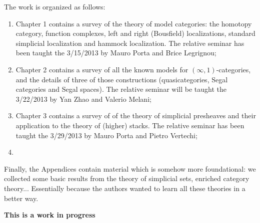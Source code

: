 \documentclass[a4paper]{memoir}
\theoremstyle{definition}
\theoremstyle{definition}
\theoremstyle{remark}
\begin{document}
The work is organized as follows:

\begin{enumerate}
\item Chapter 1 contains a survey of the theory of model categories: the homotopy category, function complexes, left and right (Bousfield) localizations, standard simplicial localization and hammock localization. The relative seminar has been taught the 3/15/2013 by Mauro Porta and Brice Legrignou;
\item Chapter 2 contains a survey of all the known models for $(\infty,1)$-categories, and the details of three of those constructions (quasicategories, Segal categories and Segal spaces). The relative seminar will be taught the 3/22/2013 by Yan Zhao and Valerio Melani;
\item Chapter 3 contains a survey of of the theory of simplicial presheaves and their application to the theory of (higher) stacks. The relative seminar has been taught the 3/29/2013 by Mauro Porta and Pietro Vertechi;
\item
\end{enumerate}

Finally, the Appendices contain material which is somehow more foundational: we collected some basic results from the theory of simplicial sets, enriched category theory... Essentially because the authors wanted to learn all these theories in a better way.

{\bfseries This is a work in progress}

\mainmatter

%
%
%
%
%
%
%

%
%

%
%
%
%
%
%
\end{document}
